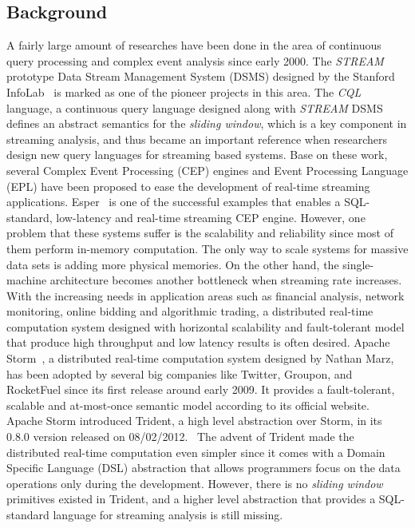 \documentclass[conference, twocolumn, 11pt]{IEEEtran}
\theoremstyle{definition}
\begin{document}
\subsection{Background}
A fairly large amount of researches have been done in the area of continuous query processing and complex event analysis since early 2000. The \emph{STREAM} prototype Data Stream Management System (DSMS)
designed by the Stanford InfoLab~\cite{ABB+03} is marked as one of the pioneer projects in this area. The \emph{CQL} language, a continuous query language designed along with \emph{STREAM} DSMS defines an abstract semantics for the \emph{sliding window}, which is a key component in streaming analysis, and thus became an important reference when researchers design new query languages for streaming based systems. Base on these work, several Complex Event Processing (CEP) engines and Event Processing Language (EPL) have been proposed to ease the development of real-time streaming applications. Esper~\cite{Paul08} is one of the successful examples that enables a SQL-standard, low-latency and real-time streaming CEP engine. However, one problem that these systems suffer is the scalability and reliability since most of them perform in-memory computation. The only way to scale systems for massive data sets is adding more physical memories. On the other hand, the single-machine architecture becomes another bottleneck when streaming rate increases. With the increasing needs in application areas such as financial analysis, network monitoring, online bidding and algorithmic trading, a distributed real-time computation system designed with horizontal scalability and fault-tolerant model that produce high throughput and low latency results is often desired. Apache Storm~\cite{Storm}, a distributed real-time computation system designed by Nathan Marz, has been adopted by several big companies like Twitter, Groupon, and RocketFuel since its first release around early 2009. It provides a fault-tolerant, scalable and at-most-once semantic model according to its official website. Apache Storm introduced Trident, a high level abstraction over Storm, in its 0.8.0 version released on 08/02/2012.~\cite{Trident} The advent of Trident made the distributed real-time computation even simpler since it comes with a Domain Specific Language (DSL) abstraction that allows programmers focus on the data operations only during the development. However, there is no \emph{sliding window} primitives existed in Trident, and a higher level abstraction that provides a SQL-standard language for streaming analysis is still missing.
\end{document}
